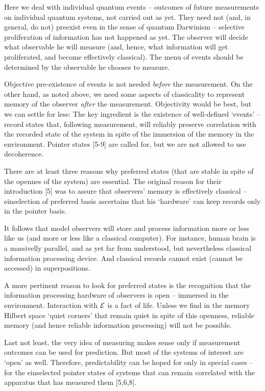 \documentclass[aps,pra,epsfig,11pt,floatfix]{revtex4}
\begin{document}
Here we deal with individual quantum events -- outcomes of future
measurements on individual quantum systems, not carried out as yet. They
need not (and, in general, do not) preexist even in the sense of quantum
Darwinism -- selective proliferation of information has not happened as yet.
The observer will decide what observable he will measure (and, hence, what
information will get proliferated, and become effectively classical). The menu of
events should be determined by the observable he chooses to measure.

Objective pre-existence of events is not needed {\it before} the measurement.
On the other hand, as noted above, we need some aspects of classicality to
represent memory of the observer {\it after} the measurement. Objectivity
would be best, but we can settle for less: The key ingredient is the
existence of well-defined `events' -- record states that, following measurement,
will reliably preserve correlation with the recorded state of the system
in spite of the immersion of the memory in the environment. Pointer 
states [5-9] are called for, but we are not allowed to use decoherence.

There are at least three reasons why preferred states (that are stable in spite
of the opennes of the system) are essential. The original reason for their
introduction [5] was  to assure that observers' memory is effectively classical 
-- einselection of preferred basis ascertains that his `hardware' 
can keep records only in the pointer basis.

It follows that model observers will store and process information more or less
like us (and more or less like a classical computer). For instance, human brain
is a massivelly parallel, and as yet far from understood, but nevertheless
classical information processing device. And classical records cannot exist
(cannot be accessed) in superpositions. 

A more pertinent reason to look for
preferred states is the recognition that the information processing hardware
of observers is open -- immersed in the environment. Interaction with 
${\cal E}$
is a fact of life. Unless we find in the memory Hilbert space `quiet corners'
that remain quiet in spite of this openness, reliable memory (and 
hence reliable
information processing) will not be possible. 

Last not least, the very
idea of measuring makes sense only if measurement outcomes can be used
for prediction. But most of the systems of interest are `open' as well.
Therefore, predictability can be hoped for only in special cases -- for the
einselected pointer states of systems that can remain correlated with
the apparatus that has measured them [5,6,8].
\end{document}
